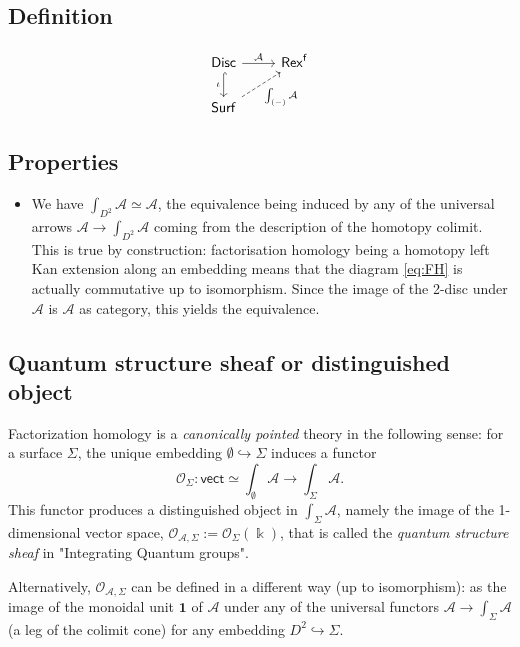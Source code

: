 \documentclass[11pt]{article}
\newcommand{\cat}[1]{\mathcal{#1}}
\newcommand{\Rexf}{\mathsf{Rex}^{\mathsf{f}}}
\newcommand{\cA}{\mathcal{A}}
\theoremstyle{definition}
\begin{document}
\subsection{Definition}


\begin{equation}\label{eq:FH}
\begin{tikzcd}
\mathsf{Disc} \rar{\cA} \arrow[hook]{d}[swap]{\iota} & \Rexf \\
\mathsf{Surf}  \arrow[dashed]{ur}[swap]{\int_{(-)} \cA}  &
\end{tikzcd}
\end{equation}


\subsection{Properties}


\begin{itemize}
    \item We have $\int_{D^2} \cA \simeq \cA$, the equivalence being induced by any of the universal arrows $\cA \to \int_{D^2} \cA $ coming from the description of the homotopy colimit. This is true by construction: factorisation homology being a homotopy left Kan extension along an embedding means that the diagram \eqref{eq:FH} is actually commutative up to isomorphism. Since the image of the 2-disc under $\cA$ is $\cA$ as category, this yields the equivalence.
\end{itemize}


\subsection{Quantum structure sheaf or distinguished object}

Factorization homology is a \emph{canonically pointed} theory in the following sense: for a surface $\Sigma$, the unique embedding $\emptyset \hookrightarrow \Sigma$ induces a functor $$ \cat{O}_\Sigma: \mathsf{vect} \simeq \int_{\emptyset} \cA \to \int_\Sigma \cA  .$$ This functor produces a distinguished object in $\int_\Sigma \cA$, namely the image of the 1-dimensional vector space, $\cat{O}_{\cA, \Sigma} := \cat{O}_\Sigma (\Bbbk)$, that is called the \emph{quantum structure sheaf} in "Integrating Quantum groups".

Alternatively, $\cat{O}_{\cA, \Sigma}$ can be defined in a different way (up to isomorphism):  as the image of the monoidal unit $\mathbf{1}$ of $\cA$ under any of the universal functors $\cA \to \int_\Sigma \cA$  (a leg of the colimit cone) for any embedding $D^2 \hookrightarrow \Sigma$. 
\end{document}
